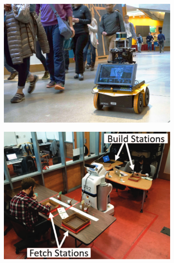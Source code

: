 \begin{figure}
    \centering
    \begin{subfigure}[c]{0.41\textwidth}
        \centering
        \includegraphics[width=\textwidth]{Figures/MADRL/robnav.png}
        \caption{}
        \label{fig:robnav}
    \end{subfigure}
    \hfill
    \begin{subfigure}[c]{0.39\textwidth}
        \centering
        \includegraphics[width=\textwidth]{Figures/MADRL/robassist.png}
        \caption{}
        \label{fig:robassist}
    \end{subfigure}
    

\end{figure}
